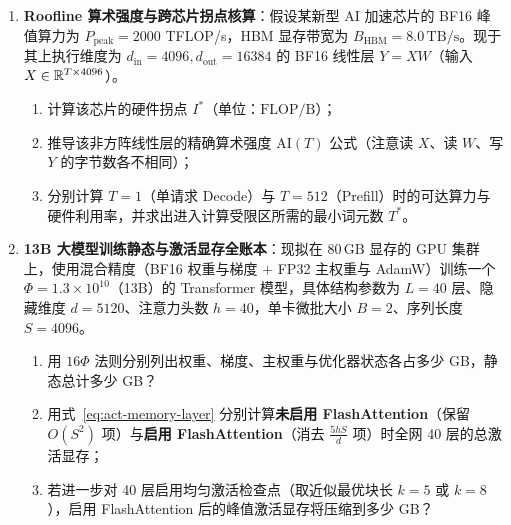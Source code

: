 \begin{enumerate}
  \item[\textbf{6.5.1}] \textbf{Roofline 算术强度与跨芯片拐点核算}：假设某新型 AI 加速芯片的 BF16 峰值算力为 $P_{\mathrm{peak}} = 2000$ TFLOP/s，HBM 显存带宽为 $B_{\mathrm{HBM}} = 8.0\,\mathrm{TB/s}$。现于其上执行维度为 $d_{\mathrm{in}} = 4096, d_{\mathrm{out}} = 16384$ 的 BF16 线性层 $Y = X W$（输入 $X \in \mathbb{R}^{T \times 4096}$）。
  \begin{enumerate}
    \item 计算该芯片的硬件拐点 $I^*$（单位：$\mathrm{FLOP/B}$）；
    \item 推导该非方阵线性层的精确算术强度 $\mathrm{AI}(T)$ 公式（注意读 $X$、读 $W$、写 $Y$ 的字节数各不相同）；
    \item 分别计算 $T = 1$（单请求 Decode）与 $T = 512$（Prefill）时的可达算力与硬件利用率，并求出进入计算受限区所需的最小词元数 $T^*$。
  \end{enumerate}

  \item[\textbf{6.5.2}] \textbf{13B 大模型训练静态与激活显存全账本}：现拟在 $80\,\mathrm{GB}$ 显存的 GPU 集群上，使用混合精度（BF16 权重与梯度 + FP32 主权重与 AdamW）训练一个 $\Phi = 1.3\times 10^{10}$（13B）的 Transformer 模型，具体结构参数为 $L = 40$ 层、隐藏维度 $d = 5120$、注意力头数 $h = 40$，单卡微批大小 $B = 2$、序列长度 $S = 4096$。
  \begin{enumerate}
    \item 用 $16\Phi$ 法则分别列出权重、梯度、主权重与优化器状态各占多少 GB，静态总计多少 GB？
    \item 用式~\eqref{eq:act-memory-layer} 分别计算\textbf{未启用 FlashAttention}（保留 $O(S^2)$ 项）与\textbf{启用 FlashAttention}（消去 $\frac{5hS}{d}$ 项）时全网 40 层的总激活显存；
    \item 若进一步对 40 层启用均匀激活检查点（取近似最优块长 $k = 5$ 或 $k = 8$），启用 FlashAttention 后的峰值激活显存将压缩到多少 GB？
  \end{enumerate}
\end{enumerate}

